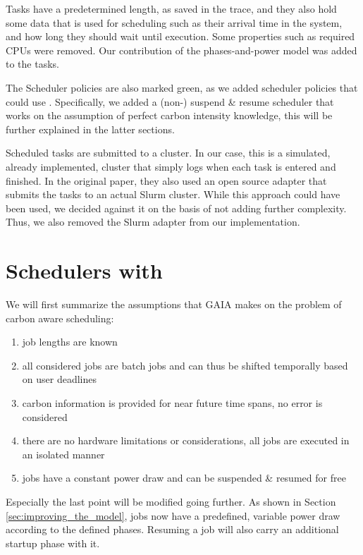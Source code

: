 Tasks have a predetermined length, as saved in the trace, and they also hold some data that is used for scheduling such as their arrival time in the system, and how long they should wait until execution. 
Some properties such as required CPUs were removed.
Our contribution of the phases-and-power model was added to the tasks.

The Scheduler policies are also marked green, as we added scheduler policies that could use \modelname. Specifically, we added a (non-) suspend \& resume scheduler that works on the assumption of perfect carbon intensity knowledge, this will be further explained in the latter sections.

Scheduled tasks are submitted to a cluster.
In our case, this is a simulated, already implemented, cluster that simply logs when each task is entered and finished. 
In the original paper, they also used an open source adapter that submits the tasks to an actual Slurm cluster. 
While this approach could have been used, we decided against it on the basis of not adding further complexity. 
Thus, we also removed the Slurm adapter from our implementation.

\chapter{Schedulers with \modelname}

We will first summarize the assumptions that GAIA makes on the problem of carbon aware scheduling:

\begin{enumerate}
    \item job lengths are known
    \item all considered jobs are batch jobs and can thus be shifted temporally based on user deadlines
    \item carbon information is provided for near future time spans, no error is considered
    \item there are no hardware limitations or considerations, all jobs are executed in an isolated manner
    \item jobs have a constant power draw and can be suspended \& resumed for free
\end{enumerate}

Especially the last point will be modified going further. As shown in Section \ref{sec:improving_the_model}, jobs now have a predefined, variable power draw according to the defined phases. Resuming a job will also carry an additional startup phase with it.

